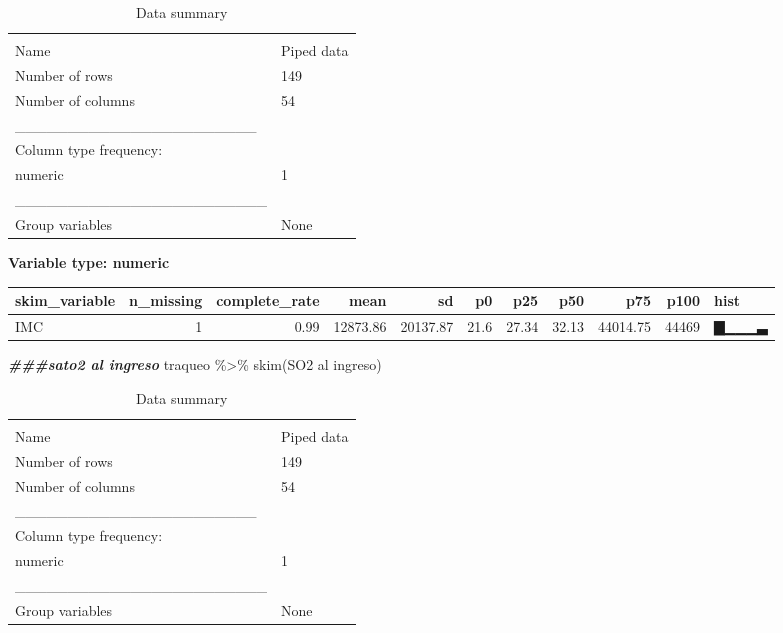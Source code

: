 \documentclass[
]{article}
\newenvironment{Shaded}{\begin{snugshade}}{\end{snugshade}}
\newcommand{\AttributeTok}[1]{\textcolor[rgb]{0.77,0.63,0.00}{#1}}
\newcommand{\DocumentationTok}[1]{\textcolor[rgb]{0.56,0.35,0.01}{\textbf{\textit{#1}}}}
\newcommand{\FunctionTok}[1]{\textcolor[rgb]{0.00,0.00,0.00}{#1}}
\newcommand{\NormalTok}[1]{#1}
\newcommand{\SpecialCharTok}[1]{\textcolor[rgb]{0.00,0.00,0.00}{#1}}
\newcommand{\StringTok}[1]{\textcolor[rgb]{0.31,0.60,0.02}{#1}}
\begin{document}
\begin{longtable}[]{@{}ll@{}}
\caption{Data summary}\tabularnewline
\toprule
& \\
\midrule
\endfirsthead
\toprule
& \\
\midrule
\endhead
Name & Piped data \\
Number of rows & 149 \\
Number of columns & 54 \\
\_\_\_\_\_\_\_\_\_\_\_\_\_\_\_\_\_\_\_\_\_\_\_ & \\
Column type frequency: & \\
numeric & 1 \\
\_\_\_\_\_\_\_\_\_\_\_\_\_\_\_\_\_\_\_\_\_\_\_\_ & \\
Group variables & None \\
\bottomrule
\end{longtable}

\textbf{Variable type: numeric}

\begin{longtable}[]{@{}lrrrrrrrrrl@{}}
\toprule
skim\_variable & n\_missing & complete\_rate & mean & sd & p0 & p25 &
p50 & p75 & p100 & hist \\
\midrule
\endhead
IMC & 1 & 0.99 & 12873.86 & 20137.87 & 21.6 & 27.34 & 32.13 & 44014.75 &
44469 & ▇▁▁▁▃ \\
\bottomrule
\end{longtable}

\begin{Shaded}
\begin{Highlighting}[]
\DocumentationTok{\#\#\#sato2 al ingreso}
\NormalTok{traqueo }\SpecialCharTok{\%\textgreater{}\%}
  \FunctionTok{skim}\NormalTok{(}\StringTok{\textasciigrave{}}\AttributeTok{SO2 al ingreso}\StringTok{\textasciigrave{}}\NormalTok{)}
\end{Highlighting}
\end{Shaded}

\begin{longtable}[]{@{}ll@{}}
\caption{Data summary}\tabularnewline
\toprule
& \\
\midrule
\endfirsthead
\toprule
& \\
\midrule
\endhead
Name & Piped data \\
Number of rows & 149 \\
Number of columns & 54 \\
\_\_\_\_\_\_\_\_\_\_\_\_\_\_\_\_\_\_\_\_\_\_\_ & \\
Column type frequency: & \\
numeric & 1 \\
\_\_\_\_\_\_\_\_\_\_\_\_\_\_\_\_\_\_\_\_\_\_\_\_ & \\
Group variables & None \\
\bottomrule
\end{longtable}
\end{document}
